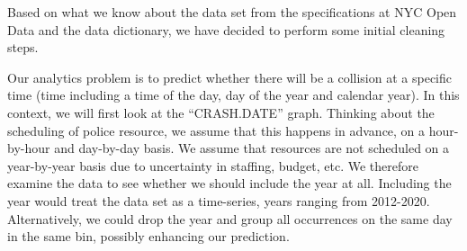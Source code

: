 
Based on what we know about the data set from the specifications at NYC
Open Data and the data dictionary, we have decided to perform some
initial cleaning steps.

Our analytics problem is to predict whether there will be a collision at
a specific time (time including a time of the day, day of the year and
calendar year). In this context, we will first look at the
``CRASH.DATE'' graph. Thinking about the scheduling of police resource,
we assume that this happens in advance, on a hour-by-hour and day-by-day
basis. We assume that resources are not scheduled on a year-by-year
basis due to uncertainty in staffing, budget, etc. We therefore examine
the data to see whether we should include the year at all. Including the
year would treat the data set as a time-series, years ranging from
2012-2020. Alternatively, we could drop the year and group all
occurrences on the same day in the same bin, possibly enhancing our
prediction.

